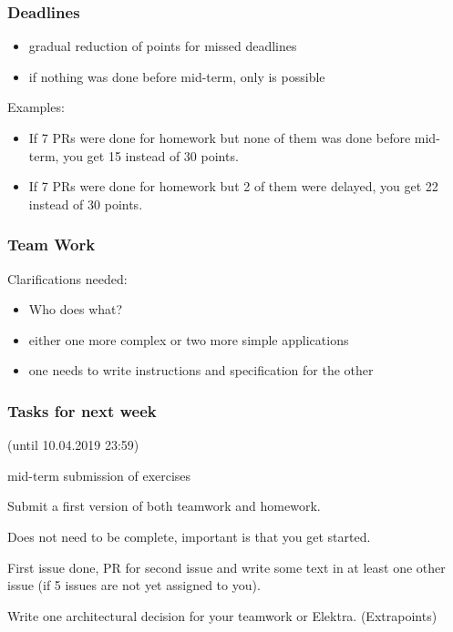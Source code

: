 \begin{frame}
	\frametitle{Deadlines}

	\begin{itemize}
	\item gradual reduction of points for missed deadlines
	\item if nothing was done before mid-term, only  is possible
	\end{itemize}
	Examples:

	\begin{itemize}
	\item If 7 PRs were done for homework but none of them was done before mid-term, you get 15 instead of 30 points.
	\item If 7 PRs were done for homework but 2 of them were delayed, you get 22 instead of 30 points.
	\end{itemize}
\end{frame}

\begin{frame}
	\frametitle{Team Work}


	Clarifications needed:
	\begin{itemize}
	\item Who does what?
	\item either one more complex or two more simple applications
	\item one needs to write instructions and specification for the other
	\end{itemize}
\end{frame}

\begin{assignment}
	\frametitle{Tasks for next week}
	(until 10.04.2019 23:59)

	mid-term submission of exercises
	
	\begin{task}
	Submit a first version of both teamwork and homework.
	\end{task}

	Does not need to be complete, important is that you get started.

	\begin{task}
	First issue done, PR for second issue and write some text in at least one other issue (if 5 issues are not yet assigned to you).
	\end{task}

	\begin{task}
	Write one architectural decision for your teamwork or Elektra. (Extrapoints)
	\end{task}
\end{assignment}




